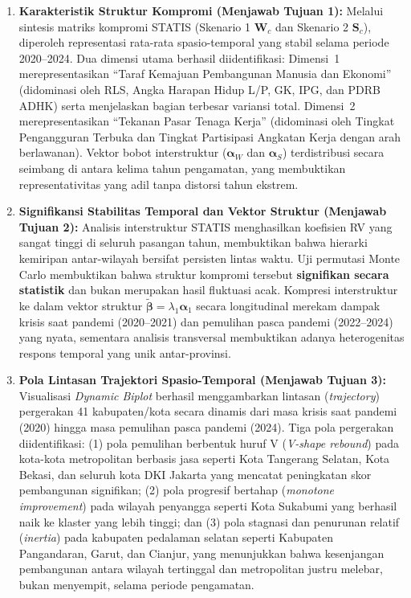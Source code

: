 \begin{enumerate}
    \item \textbf{Karakteristik Struktur Kompromi (Menjawab Tujuan 1):}
    Melalui sintesis matriks kompromi STATIS (Skenario 1 $\mathbf{W}_c$ dan Skenario 2 $\mathbf{S}_c$), diperoleh representasi rata-rata spasio-temporal yang stabil selama periode 2020--2024. Dua dimensi utama berhasil diidentifikasi: Dimensi~1 merepresentasikan ``Taraf Kemajuan Pembangunan Manusia dan Ekonomi'' (didominasi oleh RLS, Angka Harapan Hidup L/P, GK, IPG, dan PDRB ADHK) serta menjelaskan bagian terbesar variansi total. Dimensi~2 merepresentasikan ``Tekanan Pasar Tenaga Kerja'' (didominasi oleh Tingkat Pengangguran Terbuka dan Tingkat Partisipasi Angkatan Kerja dengan arah berlawanan). Vektor bobot interstruktur ($\boldsymbol{\alpha}_W$ dan $\boldsymbol{\alpha}_S$) terdistribusi secara seimbang di antara kelima tahun pengamatan, yang membuktikan representativitas yang adil tanpa distorsi tahun ekstrem.

    \item \textbf{Signifikansi Stabilitas Temporal dan Vektor Struktur (Menjawab Tujuan 2):}
    Analisis interstruktur STATIS menghasilkan koefisien RV yang sangat tinggi di seluruh pasangan tahun, membuktikan bahwa hierarki kemiripan antar-wilayah bersifat persisten lintas waktu. Uji permutasi Monte Carlo membuktikan bahwa struktur kompromi tersebut \textbf{signifikan secara statistik} dan bukan merupakan hasil fluktuasi acak. Kompresi interstruktur ke dalam vektor struktur $\tilde{\boldsymbol{\beta}} = \lambda_1 \boldsymbol{\alpha}_1$ secara longitudinal merekam dampak krisis saat pandemi (2020--2021) dan pemulihan pasca pandemi (2022--2024) yang nyata, sementara analisis transversal membuktikan adanya heterogenitas respons temporal yang unik antar-provinsi.

    \item \textbf{Pola Lintasan Trajektori Spasio-Temporal (Menjawab Tujuan 3):}
    Visualisasi \textit{Dynamic Biplot} berhasil menggambarkan lintasan (\textit{trajectory}) pergerakan 41 kabupaten/kota secara dinamis dari masa krisis saat pandemi (2020) hingga masa pemulihan pasca pandemi (2024). Tiga pola pergerakan diidentifikasi: (1) pola pemulihan berbentuk huruf V (\textit{V-shape rebound}) pada kota-kota metropolitan berbasis jasa seperti Kota Tangerang Selatan, Kota Bekasi, dan seluruh kota DKI Jakarta yang mencatat peningkatan skor pembangunan signifikan; (2) pola progresif bertahap (\textit{monotone improvement}) pada wilayah penyangga seperti Kota Sukabumi yang berhasil naik ke klaster yang lebih tinggi; dan (3) pola stagnasi dan penurunan relatif (\textit{inertia}) pada kabupaten pedalaman selatan seperti Kabupaten Pangandaran, Garut, dan Cianjur, yang menunjukkan bahwa kesenjangan pembangunan antara wilayah tertinggal dan metropolitan justru melebar, bukan menyempit, selama periode pengamatan.


\end{enumerate}
